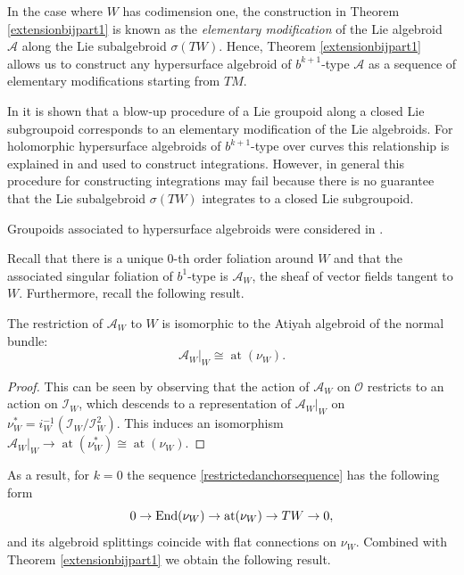 \documentclass[10pt]{amsart}
\newcommand{\A}{{\mathcal{A}}}
\DeclareMathOperator{\at}{at}
\numberwithin{theoremalpha}{section}
\numberwithin{equation}{section}
\numberwithin{definition}{section}
\numberwithin{theorem}{section}
\numberwithin{proposition}{section}
\numberwithin{lemma}{section}
\numberwithin{example}{section}
\numberwithin{remark}{section}
\numberwithin{corollary}{section}
\numberwithin{question}{section}
\numberwithin{problem}{section}
\numberwithin{assumption}{section}
\theoremstyle{named}
\numberwithin{equation}{section}
\begin{document}
\begin{remark}
In the case where $W$ has codimension one, the construction in Theorem \ref{extensionbijpart1} is known as the \emph{elementary modification} of the Lie algebroid $\A$ along the Lie subalgebroid $\sigma(TW)$. Hence, Theorem \ref{extensionbijpart1} allows us to construct any hypersurface algebroid of $b^{k+1}$-type $\A$ as a sequence of elementary modifications starting from $TM$.

In \cite{Gualtieri-Li-2012} it is shown that a blow-up procedure of a Lie groupoid along a closed Lie subgroupoid corresponds to an elementary modification of the Lie algebroids. For holomorphic hypersurface algebroids of $b^{k+1}$-type over curves this relationship is explained in \cite{gualtieri2018stokes} and used to construct integrations. However, in general this procedure for constructing integrations may fail because there is no guarantee that the Lie subalgebroid $\sigma(TW)$ integrates to a closed Lie subgroupoid. 

Groupoids associated to hypersurface algebroids were considered in \cite{francis2024singular}. 
\end{remark}

%
Recall that there is a unique $0$-th order foliation around $W$ and that the associated singular foliation of $b^{1}$-type is $\mathcal{A}_{W}$, the sheaf of vector fields tangent to $W$. Furthermore, recall the following result.
\begin{lemma}
The restriction of $\mathcal{A}_W$ to $W$ is isomorphic to the Atiyah algebroid of the normal bundle: 
\[ \mathcal{A}_{W}|_{W} \cong \at(\nu_{W}).\]
\end{lemma}
\begin{proof}
This can be seen by observing that the action of $\mathcal{A}_W$ on $\mathcal{O}$ restricts to an action on $\mathcal{I}_{W}$, which descends to a representation of $\mathcal{A}_{W}|_{W}$ on $\nu_{W}^{*} = i_{W}^{-1}(\mathcal{I}_{W}/\mathcal{I}_{W}^2)$. This induces an isomorphism $\mathcal{A}_{W}|_{W} \to \at(\nu_{W}^*) \cong \at(\nu_{W})$. 
\end{proof}
As a result, for $k = 0$ the sequence \eqref{restrictedanchorsequence} has the following form 
\begin{equation*}
0 \rightarrow {\rm End}(\nu_W) \rightarrow \at(\nu_{W}) \rightarrow TW \rightarrow 0,
\end{equation*}
and its algebroid splittings coincide with flat connections on $\nu_{W}$. Combined with Theorem \ref{extensionbijpart1} we obtain the following result. 
\end{document}
